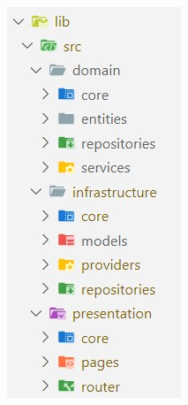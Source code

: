 \documentclass[12pt, a4paper]{book}
\begin{document}
\begin{figure}[H]
  \centering
  \begin{minipage}[b]{0.4\textwidth}
    \centering
    \includegraphics[width=\textwidth]{images/clean_arq_code_structure.jpg}

\end{minipage}
\end{figure}
\end{document}
